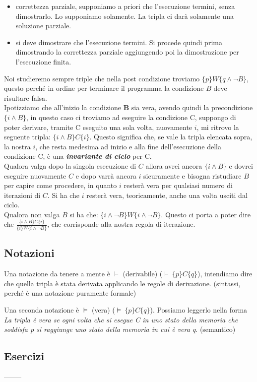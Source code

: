 \begin{itemize}
    \begin{itemize}
        \item correttezza parziale, supponiamo a priori che l'esecuzione termini, senza dimostrarlo. Lo supponiamo solamente. La tripla ci darà solamente una soluzione parziale.
        \item si deve dimostrare che l'esecuzione termini. Si procede quindi prima dimostrando la correttezza parziale aggiungendo poi la dimostrazione per l'esecuzione finita.
    \end{itemize}
    Noi studieremo sempre triple che nella post condizione troviamo $\{p\}W\{q \land \neg B\}$, questo perché in ordine per terminare il programma la condizione $B$ deve risultare falsa.\\
    Ipotizziamo che all'inizio la condizione \textbf{B} sia vera, avendo quindi la precondizione $\{i \land B\}$, in questo caso ci troviamo ad eseguire la condizione C, suppongo di poter derivare, tramite C eseguito una sola volta, nuovamente $i$, mi ritrovo la seguente tripla: $\{i \land B\}C\{i\}$.
    Questo significa che, se vale la tripla elencata sopra, la nostra $i$, che resta medesima ad inizio e alla fine dell'esecuzione della condizione C, è una \textbf{\textit{invariante di ciclo}} per C.\\
    Qualora valga dopo la singola esecuzione di $C$ allora avrei ancora $\{i\land B\}$ e dovrei eseguire nuovamente $C$ e dopo varrà ancora $i$ sicuramente e bisogna ristudiare $B$ per capire come procedere, in quanto $i$ resterà vera per qualsiasi numero di iterazioni di $C$. Si ha che $i$ resterà vera, teoricamente, anche una volta usciti dal ciclo. \\
    Qualora non valga $B$ si ha che: $\{i\land \neg B\}W\{i\land \neg B\}$. Questo ci porta a poter dire che  $\displaystyle \frac{\{i \land B\}C\{i\}}{\{i\}W\{i\land \neg B\}}$, che corrisponde alla nostra regola di iterazione. 
\end{itemize}


\subsection{Notazioni}
Una notazione da tenere a mente è $\vdash$ (derivabile) (\textbf{$\vdash \ \{p\}C\{q\}$}), intendiamo dire che quella tripla è stata derivata applicando le regole di derivazione. (sintassi, perché è una notazione puramente formale)

Una seconda notazione è $\models$ (vera) (\textbf{$\models \ \{p\}C\{q\}$}). Possiamo leggerlo nella forma \textit{La tripla è vera se ogni volta che si esegue C in uno stato della memoria che soddisfa p si raggiunge uno stato della memoria in cui è vera q}. (semantico)

 

\subsection{Esercizi}



--------

